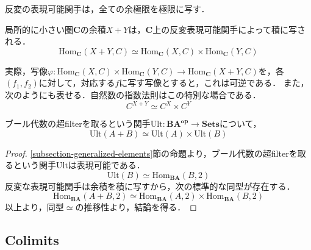 \documentclass[uplatex, 12pt, dvipdfmx]{jsarticle}
\begin{document}
\begin{corollary}
    反変の表現可能関手は，全ての余極限を極限に写す．
\end{corollary}
\begin{example*}
    局所的に小さい圏$\mathbf{C}$の余積$X+Y$は，$\mathbf{C}$上の反変表現可能関手によって積に写される．
    \[ \mathrm{Hom}_\mathbf{C}(X+Y,C)\simeq \mathrm{Hom}_\mathbf{C}(X,C)\times \mathrm{Hom}_\mathbf{C}(Y,C) \]
    \begin{center}
    \end{center}
    実際，写像$\varphi:\mathrm{Hom}_\mathbf{C}(X,C)\times \mathrm{Hom}_\mathbf{C}(Y,C)\to\mathrm{Hom}_\mathbf{C}(X+Y,C)$を，各$(f_1,f_2)$に対して，対応する$f$に写す写像とすると，これは可逆である．
    また，次のようにも表せる．自然数の指数法則はこの特別な場合である．
    \[ C^{X+Y}\simeq C^X\times C^Y \]
\end{example*}
\begin{proposition*}
    ブール代数の超filterを取るという関手$\mathrm{Ult}:\mathbf{BA^{op}}\to\mathbf{Sets}$について，
    \[ \mathrm{Ult}(A+B)\simeq\mathrm{Ult}(A)\times\mathrm{Ult}(B) \]
\end{proposition*}
\begin{proof}
    \ref{subsection-generalized-elements}節の命題より，ブール代数の超filterを取るという関手$\mathrm{Ult}$は表現可能である．
    \[ \mathrm{Ult}(B)\simeq\mathrm{Hom}_\mathbf{BA}(B,2) \]
    反変な表現可能関手は余積を積に写すから，次の標準的な同型が存在する．
    \[ \mathrm{Hom}_\mathbf{BA}(A+B,2) \simeq \mathrm{Hom}_\mathbf{BA}(A,2)\times\mathrm{Hom}_\mathbf{BA}(B,2) \]
    以上より，同型$\simeq$の推移性より，結論を得る．
\end{proof}

\subsection{Colimits}
\end{document}
